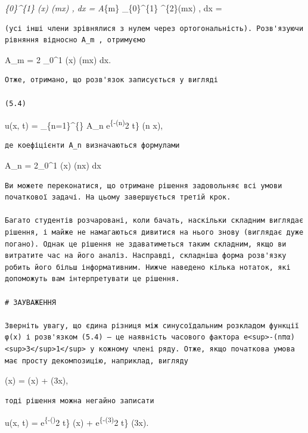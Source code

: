 \documentclass[
  ukrainian,
]{article}
\begin{document}
\int\emph{\{0\}\^{}\{1\} \varphi(x) \sin(m\pi x) , dx = A}\{m\}
\int\_\{0\}\^{}\{1\} \sin\^{}\{2\}(m\pi x) , dx = 

\begin{verbatim}
(усі інші члени зрівнялися з нулем через ортогональність). Розв'язуючи рівняння відносно A_m , отримуємо
\end{verbatim}

A\_m = 2 \int\_0\^{}1 \varphi(x) \sin(m\pi x) dx.

\begin{verbatim}
Отже, отримано, що розв'язок записується у вигляді

(5.4)
\end{verbatim}

u(x, t) = \sum\_\{n=1\}\^{}\{\infty\} A\_n
e\textsuperscript{\{-(n\pi\alpha)}2 t\} \sin(\pi n x),

\begin{verbatim}
де коефіцієнти A_n визначаються формулами
\end{verbatim}

A\_n = 2\int\_0\^{}1 \varphi(x) \sin(\pi nx) dx

\begin{verbatim}
Ви можете переконатися, що отримане рішення задовольняє всі умови початкової задачі. На цьому завершується третій крок.

Багато студентів розчаровані, коли бачать, наскільки складним виглядає рішення, і майже не намагаються дивитися на нього знову (виглядає дуже погано). Однак це рішення не здаватиметься таким складним, якщо ви витратите час на його аналіз. Насправді, складніша форма розв'язку робить його більш інформативним. Нижче наведено кілька нотаток, які допоможуть вам інтерпретувати це рішення.

# ЗАУВАЖЕННЯ

Зверніть увагу, що єдина різниця між синусоїдальним розкладом функції φ(x) і розв'язком (5.4) — це наявність часового фактора e<sup>-(nπα)<sup>3</sup>1</sup> у кожному члені ряду. Отже, якщо початкова умова має просту декомпозицію, наприклад, вигляду
\end{verbatim}

\varphi(x) = \sin(\pi x) + \sin(3\pi x),

\begin{verbatim}
тоді рішення можна негайно записати
\end{verbatim}

u(x, t) = e\textsuperscript{\{-(\pi\alpha)}2 t\} \sin(\pi x) +
 e\textsuperscript{\{-(3\pi\alpha)}2 t\} \sin(3\pi x).
\end{document}

